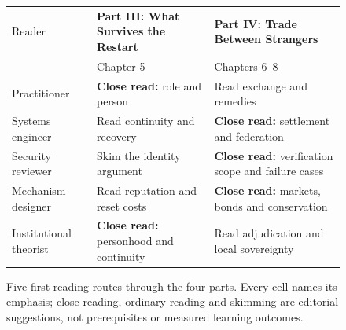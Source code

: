 \begin{figure}[H]
\centering
{\pdfiglabel\renewcommand{\arraystretch}{1.7}\setlength{\tabcolsep}{5pt}%
\begin{tabularx}{\linewidth}{@{}p{2.2cm}XX@{}}
\toprule
Reader & \textbf{Part III: What Survives the Restart} & \textbf{Part IV: Trade Between Strangers}\\
 & Chapter 5 & Chapters 6--8\\
\midrule
Practitioner & \textbf{Close read:} role and person & Read exchange and remedies\\
Systems engineer & Read continuity and recovery & \textbf{Close read:} settlement and federation\\
Security reviewer & Skim the identity argument & \textbf{Close read:} verification scope and failure cases\\
Mechanism designer & Read reputation and reset costs & \textbf{Close read:} markets, bonds and conservation\\
Institutional theorist & \textbf{Close read:} personhood and continuity & Read adjudication and local sovereignty\\
\bottomrule
\end{tabularx}}
\caption{Five first-reading routes through the four parts. Every cell names its emphasis; close reading, ordinary reading and skimming are editorial suggestions, not prerequisites or measured learning outcomes.}
\label{fig:book-reader-map}
\end{figure}
\endgroup
